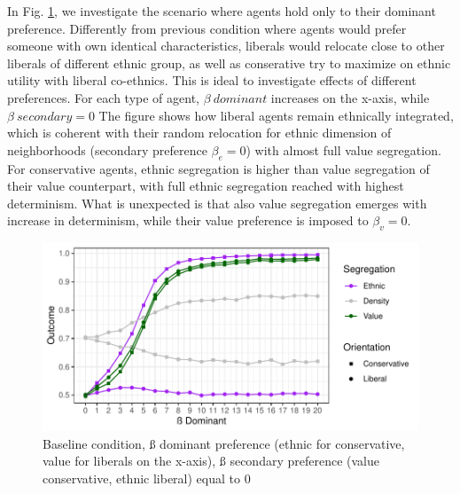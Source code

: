 \documentclass[
]{article}
\begin{document}
In Fig. \ref{fig:bsl_dom}, we investigate the scenario where agents hold
only to their dominant preference. Differently from previous condition
where agents would prefer someone with own identical characteristics,
liberals would relocate close to other liberals of different ethnic
group, as well as conserative try to maximize on ethnic utility with
liberal co-ethnics. This is ideal to investigate effects of different
preferences. For each type of agent, \(\beta\ dominant\) increases on
the x-axis, while \(\beta\ secondary = 0\) The figure shows how liberal
agents remain ethnically integrated, which is coherent with their random
relocation for ethnic dimension of neighborhoods (secondary preference
\(\beta_e = 0\)) with almost full value segregation. For conservative
agents, ethnic segregation is higher than value segregation of their
value counterpart, with full ethnic segregation reached with highest
determinism. What is unexpected is that also value segregation emerges
with increase in determinism, while their value preference is imposed to
\(\beta_v = 0\).

\begin{figure}[H]

{\centering \includegraphics[width=0.8\linewidth]{ev_rum_files/figure-latex/bsl_dom-1} 

}

\caption{Baseline condition, ß dominant preference (ethnic for conservative, value for liberals on the x-axis), ß secondary preference (value conservative, ethnic liberal) equal to 0}\label{fig:bsl_dom}
\end{figure}
\end{document}
